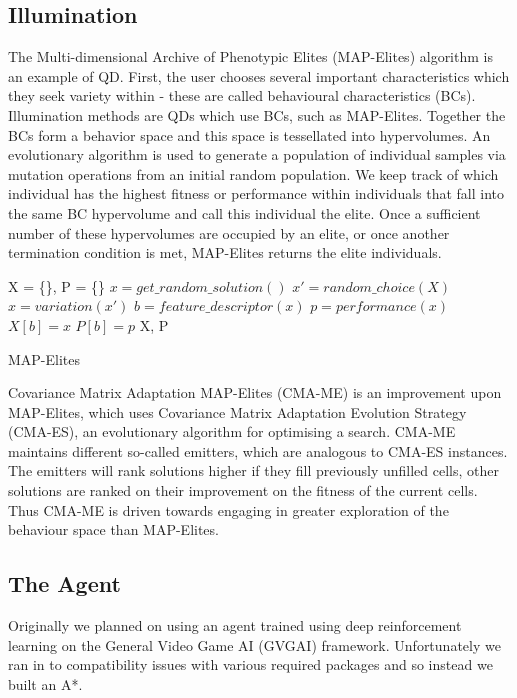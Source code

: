 \documentclass{article}
\begin{document}
\subsection{Illumination}
The Multi-dimensional Archive of Phenotypic Elites (MAP-Elites) algorithm \cite{Mouret2015} is an example of QD. First, the user chooses several important characteristics which they seek variety within - these are called behavioural characteristics (BCs). Illumination methods are QDs which use BCs, such as MAP-Elites. Together the BCs form a behavior space and this space is tessellated into hypervolumes. An evolutionary algorithm is used to generate a population of individual samples via mutation operations from an initial random population. We keep track of which individual has the highest fitness or performance within individuals that fall into the same BC hypervolume and call this individual the elite. Once a sufficient number of these hypervolumes are occupied by an elite, or once another termination condition is met, MAP-Elites returns the elite individuals.

\begin{algorithm}[ht]
\begin{algorithmic}
   \STATE X = \{\}, P = \{\}
   \STATE $x = get\_random\_solution()$
   \ELSE
   \STATE $x' = random\_choice(X)$
   \STATE $x = variation(x')$
   \ENDIF
   \STATE $b = feature\_descriptor(x)$
   \STATE $p = performance(x)$
   \STATE $X[b] = x$
   \STATE $P[b] = p$
   \ENDIF
   \ENDFOR
   \RETURN X, P
\end{algorithmic}
  \caption{MAP-Elites}
  \label{alg:example}
\end{algorithm}

Covariance Matrix Adaptation MAP-Elites (CMA-ME) is an improvement upon MAP-Elites, which uses Covariance Matrix Adaptation Evolution Strategy (CMA-ES), an evolutionary algorithm for optimising a search. CMA-ME maintains different so-called emitters, which are analogous to CMA-ES instances. The emitters will rank solutions higher if they fill previously unfilled cells, other solutions are ranked on their improvement on the fitness of the current cells. Thus CMA-ME is driven towards engaging in greater exploration of the behaviour space than MAP-Elites.


\subsection{The Agent}
Originally we planned on using an agent trained using deep reinforcement learning \cite{torrado2018deep} on the General Video Game AI (GVGAI) framework. Unfortunately we ran in to compatibility issues with various required packages and so instead we built an A*.
\end{document}

